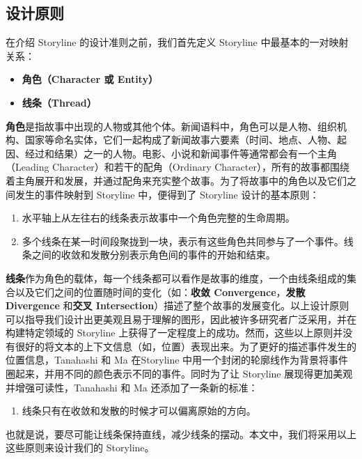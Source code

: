 \subsection{设计原则}
在介绍 Storyline 的设计准则之前，我们首先定义 Storyline 中最基本的一对映射关系：
\begin{itemize}
\item \textbf{角色（Character 或 Entity）}
\item \textbf{线条（Thread）}
\end{itemize}
\textbf{角色}是指故事中出现的人物或其他个体。新闻语料中，角色可以是人物、组织机构、国家等命名实体，它们一起构成了新闻故事六要素（时间、地点、人物、起因、经过和结果）之一的人物。电影、小说和新闻事件等通常都会有一个主角（Leading Character）和若干的配角（Ordinary Character），所有的故事都围绕着主角展开和发展，并通过配角来充实整个故事。为了将故事中的角色以及它们之间发生的事件映射到 Storyline 中，便得到了 Storyline 设计的基本原则：
\begin{enumerate}[(1)]
\item 水平轴上从左往右的线条表示故事中一个角色完整的生命周期。
\item 多个线条在某一时间段聚拢到一块，表示有这些角色共同参与了一个事件。线条之间的收敛和发散分别表示角色间的事件的开始和结束。
\end{enumerate}
\textbf{线条}作为角色的载体，每一个线条都可以看作是故事的维度，一个由线条组成的集合以及它们之间的位置随时间的变化（如：\textbf{收敛 Convergence}，\textbf{发散 Divergence} 和\textbf{交叉 Intersection}）描述了整个故事的发展变化。以上设计原则可以指导我们设计出更美观且易于理解的图形，因此被许多研究者广泛采用\cite{Ogawa:2010, Kim:2010}，并在构建特定领域的 Storyline 上获得了一定程度上的成功。然而，这些以上原则并没有很好的将文本的上下文信息（如，位置）表现出来。为了更好的描述事件发生的位置信息，Tanahashi 和 Ma \cite{tanahashi2012design} 在Storyline 中用一个封闭的轮廓线作为背景将事件圈起来，并用不同的颜色表示不同的事件。同时为了让 Storyline 展现得更加美观并增强可读性，Tanahashi 和 Ma 还添加了一条新的标准：
\begin{enumerate}[(3)]
\item 线条只有在收敛和发散的时候才可以偏离原始的方向。
\end{enumerate}
也就是说，要尽可能让线条保持直线，减少线条的摆动。本文中，我们将采用以上这些原则来设计我们的 Storyline。

